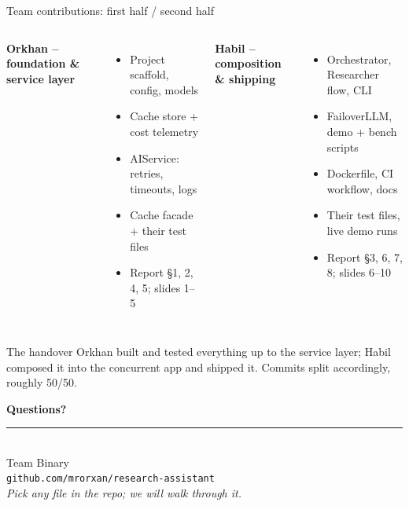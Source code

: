 \documentclass[aspectratio=169,10pt]{beamer}
\newcommand{\teamname}{Binary}
\newcommand{\repolink}{github.com/mrorxan/research-assistant}
\begin{document}
\begin{frame}{Team contributions: first half / second half}
  \begin{columns}[T,onlytextwidth]
  \textbf{Orkhan -- foundation \& service layer}
  \begin{itemize}\setlength\itemsep{0.3em}
    \item Project scaffold, config, models
    \item Cache store + cost telemetry
    \item AIService: retries, timeouts, logs
    \item Cache facade + their test files
    \item Report \S 1, 2, 4, 5; slides 1--5
  \end{itemize}

  \textbf{Habil -- composition \& shipping}
  \begin{itemize}\setlength\itemsep{0.3em}
    \item Orchestrator, Researcher flow, CLI
    \item FailoverLLM, demo + bench scripts
    \item Dockerfile, CI workflow, docs
    \item Their test files, live demo runs
    \item Report \S 3, 6, 7, 8; slides 6--10
  \end{itemize}
  \end{columns}

  \vspace{0.9em}
  \begin{block}{The handover}
    Orkhan built and tested everything up to the service layer; Habil composed it
    into the concurrent app and shipped it. Commits split accordingly, roughly 50/50.
  \end{block}
\end{frame}

\begin{frame}
  \begin{center}
    \vspace{0.9cm}
    {\Huge\bfseries\color{accent} Questions?}\\[1.2em]
    \rule{0.5\textwidth}{0.6pt}\\[1.2em]
    {\large Team \teamname}\\[0.6em]
    {\normalsize \texttt{\repolink}}\\[0.8em]
    {\footnotesize\itshape Pick any file in the repo; we will walk through it.}
  \end{center}
\end{frame}
\end{document}
